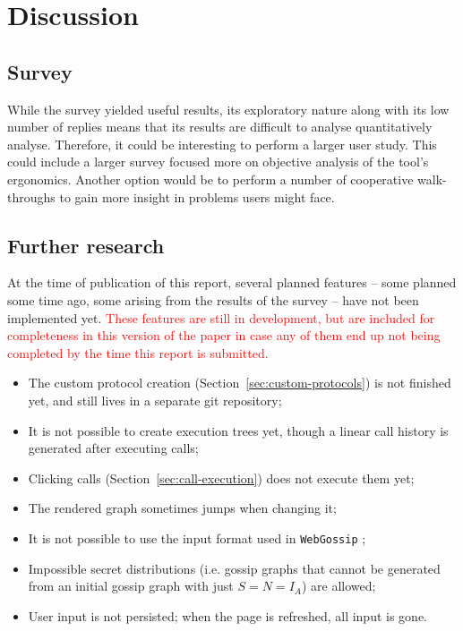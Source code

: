 
\section{Discussion}

\subsection{Survey}

While the survey yielded useful results, its exploratory nature along with its low number of replies means that its results are difficult to analyse quantitatively analyse.
Therefore, it could be interesting to perform a larger user study.
This could include a larger survey focused more on objective analysis of the tool's ergonomics.
Another option would be to perform a number of cooperative walk-throughs to gain more insight in problems users might face.

\subsection{Further research}

At the time of publication of this report, several planned features -- some planned some time ago, some arising from the results of the survey -- have not been implemented yet.
\textcolor{red}{These features are still in development, but are included for completeness in this version of the paper in case any of them end up not being completed by the time this report is submitted.}

\begin{itemize}
    \item The custom protocol creation (Section~\ref{sec:custom-protocols}) is not finished yet, and still lives in a separate git repository;
    \item It is not possible to create execution trees yet, though a linear call history is generated after executing calls;
    \item Clicking calls (Section~\ref{sec:call-execution}) does not execute them yet;
    \item The rendered graph sometimes jumps when changing it;
    \item It is not possible to use the input format used in \texttt{WebGossip} \parencite{gattinger_webgossip_nodate};
    \item Impossible secret distributions (i.e. gossip graphs that cannot be generated from an initial gossip graph with just \(S = N = I_A \)) are allowed;
    \item User input is not persisted; when the page is refreshed, all input is gone.
\end{itemize}



